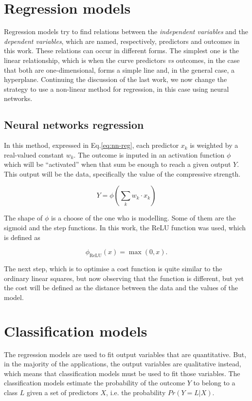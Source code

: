 \documentclass[conference]{IEEEtran}
\begin{document}
\section{Regression models}\label{sec:rm}

Regression models try to find relations between the \emph{independent variables} and the \emph{dependent variables}, which are named, respectively, predictors and outcomes in this work. These relations can occur in different forms. The simplest one is the linear relationship, which is when the curve predictors \textit{vs} outcomes, in the case that both are one-dimensional, forms a simple line and, in the general case, a hyperplane. Continuing the discussion of the last work, we now change the strategy to use a non-linear method for regression, in this case using neural networks.

\subsection{Neural networks regression}

In this method, expressed in Eq.\ref{eq:nn-reg}, each predictor $x_k$ is weighted by a real-valued constant $w_k$. The outcome is inputed in an activation function $\phi$ which will be ``activated'' when that sum be enough to reach a given output $Y$. This output will be the data, specifically the value of the compressive strength.

\begin{equation}\label{eq:nn-reg}
Y = \phi \left( \sum_k w_k \cdot x_k \right)
\end{equation}

The shape of $\phi$ is a choose of the one who is modelling. Some of them are the sigmoid and the step functions. In this work, the ReLU function was used, which is defined as 

\begin{equation}
\phi_\text{ReLU}(x) = \operatorname{max}(0,x).
\end{equation}

The next step, which is to optimise a cost function is quite similar to the ordinary linear squares, but now observing that the function is different, but yet the cost will be defined as the distance between the data and the values of the model.

\section{Classification models}
The regression models are used to fit output variables that are quantitative. But, in the majority of the applications, the output variables are qualitative instead, which means that classification models must be used to fit those variables. The classification models estimate the probability of the outcome $Y$ to belong to a class $L$ given a set of predictors $X$, i.e. the probability $Pr(Y=L|X)$.
\end{document}
